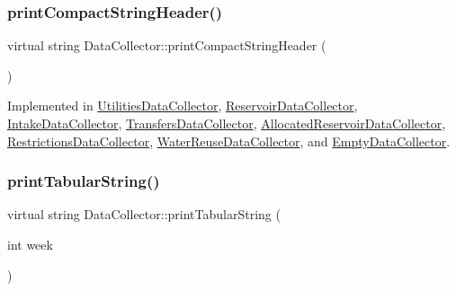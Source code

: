 \subsubsection{\texorpdfstring{print\+Compact\+String\+Header()}{printCompactStringHeader()}}
{\footnotesize\ttfamily virtual string Data\+Collector\+::print\+Compact\+String\+Header (\begin{DoxyParamCaption}{ }\end{DoxyParamCaption})\hspace{0.3cm}{\ttfamily [pure virtual]}}



Implemented in \mbox{\hyperlink{classUtilitiesDataCollector_ab3409c407783fd4451f310d2fc177b22_ab3409c407783fd4451f310d2fc177b22}{Utilities\+Data\+Collector}}, \mbox{\hyperlink{classReservoirDataCollector_aa8346433f037bbca41f3c8450f7f88cf_aa8346433f037bbca41f3c8450f7f88cf}{Reservoir\+Data\+Collector}}, \mbox{\hyperlink{classIntakeDataCollector_a42d56dd08e57a7e6e48812a2ab522439_a42d56dd08e57a7e6e48812a2ab522439}{Intake\+Data\+Collector}}, \mbox{\hyperlink{classTransfersDataCollector_a29750b8b76fa82d70d4f472a0e36ceba_a29750b8b76fa82d70d4f472a0e36ceba}{Transfers\+Data\+Collector}}, \mbox{\hyperlink{classAllocatedReservoirDataCollector_adbedebdf593bee81447671fb8f6ef2fe_adbedebdf593bee81447671fb8f6ef2fe}{Allocated\+Reservoir\+Data\+Collector}}, \mbox{\hyperlink{classRestrictionsDataCollector_ad36ff12a666d72c92893c918715628f6_ad36ff12a666d72c92893c918715628f6}{Restrictions\+Data\+Collector}}, \mbox{\hyperlink{classWaterReuseDataCollector_afef08bead3f2c60c2b9c975864456ef1_afef08bead3f2c60c2b9c975864456ef1}{Water\+Reuse\+Data\+Collector}}, and \mbox{\hyperlink{classEmptyDataCollector_a345d478e92af2ab4bcbaeeae3c7a3faa_a345d478e92af2ab4bcbaeeae3c7a3faa}{Empty\+Data\+Collector}}.

\mbox{\label{classDataCollector_a397fccabe0223267eea8fc7cac0e59da_a397fccabe0223267eea8fc7cac0e59da}} 
\subsubsection{\texorpdfstring{print\+Tabular\+String()}{printTabularString()}}
{\footnotesize\ttfamily virtual string Data\+Collector\+::print\+Tabular\+String (\begin{DoxyParamCaption}\item[{int}]{week }\end{DoxyParamCaption})\hspace{0.3cm}{\ttfamily [pure virtual]}}




